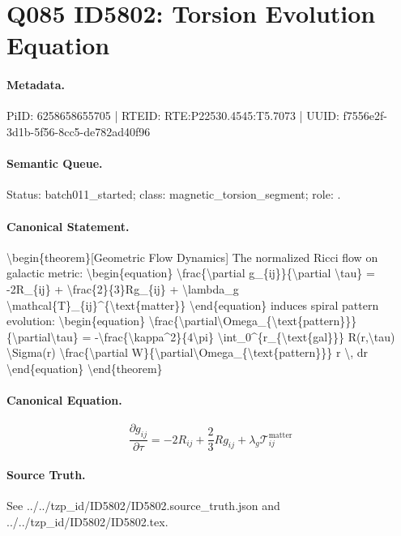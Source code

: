 \section*{Q085 ID5802: Torsion Evolution Equation}
\paragraph{Metadata.}
PiID: 6258658655705 | RTEID: RTE:P22530.4545:T5.7073 | UUID: f7556e2f-3d1b-5f56-8cc5-de782ad40f96

\paragraph{Semantic Queue.}
Status: batch011\_started; class: magnetic\_torsion\_segment; role: .

\paragraph{Canonical Statement.}
\textbackslash{}begin\{theorem\}[Geometric Flow Dynamics] The normalized Ricci flow on galactic metric: \textbackslash{}begin\{equation\} \textbackslash{}frac\{\textbackslash{}partial g\_\{ij\}\}\{\textbackslash{}partial \textbackslash{}tau\} = -2R\_\{ij\} + \textbackslash{}frac\{2\}\{3\}Rg\_\{ij\} + \textbackslash{}lambda\_g \textbackslash{}mathcal\{T\}\_\{ij\}\textasciicircum{}\{\textbackslash{}text\{matter\}\} \textbackslash{}end\{equation\} induces spiral pattern evolution: \textbackslash{}begin\{equation\} \textbackslash{}frac\{\textbackslash{}partial\textbackslash{}Omega\_\{\textbackslash{}text\{pattern\}\}\}\{\textbackslash{}partial\textbackslash{}tau\} = -\textbackslash{}frac\{\textbackslash{}kappa\textasciicircum{}2\}\{4\textbackslash{}pi\} \textbackslash{}int\_0\textasciicircum{}\{r\_\{\textbackslash{}text\{gal\}\}\} R(r,\textbackslash{}tau) \textbackslash{}Sigma(r) \textbackslash{}frac\{\textbackslash{}partial W\}\{\textbackslash{}partial\textbackslash{}Omega\_\{\textbackslash{}text\{pattern\}\}\} r \textbackslash{}, dr \textbackslash{}end\{equation\} \textbackslash{}end\{theorem\}

\paragraph{Canonical Equation.}
\[
\begin{equation} \frac{\partial g_{ij}}{\partial \tau} = -2R_{ij} + \frac{2}{3}Rg_{ij} + \lambda_g \mathcal{T}_{ij}^{\text{matter}} \end{equation}
\]

\paragraph{Source Truth.}
See ../../tzp\_id/ID5802/ID5802.source\_truth.json and ../../tzp\_id/ID5802/ID5802.tex.
